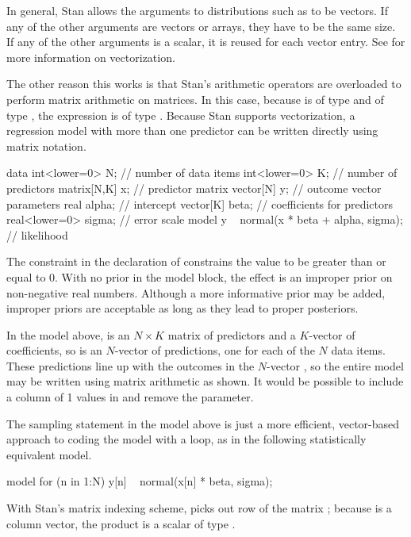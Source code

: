 In general, Stan allows the arguments to distributions such as
 to be vectors.  If any of the other arguments are
vectors or arrays, they have to be the same size.  If any of the other
arguments is a scalar, it is reused for each vector entry.  See
 for more information on vectorization.

The other reason this works is that Stan's arithmetic operators are
overloaded to perform matrix arithmetic on matrices.  In this case,
because  is of type  and  of type
, the expression  is of type .
Because Stan supports vectorization, a regression model with more than
one predictor can be written directly using matrix notation.
%
\begin{stancode}
data {
  int<lower=0> N;   // number of data items
  int<lower=0> K;   // number of predictors
  matrix[N,K] x;    // predictor matrix
  vector[N] y;      // outcome vector
}
parameters {
  real alpha;           // intercept
  vector[K] beta;       // coefficients for predictors
  real<lower=0> sigma;  // error scale
}
model {
  y ~ normal(x * beta + alpha, sigma);  // likelihood
}
\end{stancode}
%
The constraint  in the declaration of 
constrains the value to be greater than or equal to 0.  With no prior
in the model block, the effect is an improper prior on non-negative
real numbers.  Although a more informative prior may be added, improper
priors are acceptable as long as they lead to proper posteriors.

In the model above,  is an $N \times K$ matrix of predictors
and  a $K$-vector of coefficients, so  is an
$N$-vector of predictions, one for each of the $N$ data items.  These
predictions line up with the outcomes in the $N$-vector , so
the entire model may be written using matrix arithmetic as shown.  It
would be possible to include a column of 1 values in  and
remove the  parameter.  

The sampling statement in the model above is just a more efficient,
vector-based approach to coding the model with a loop, as in the
following statistically equivalent model.
%
\begin{stancode}
model {
  for (n in 1:N)
    y[n] ~ normal(x[n] * beta, sigma);
}
\end{stancode}
%
With Stan's matrix indexing scheme,  picks out row 
of the matrix ;  because  is a column vector, 
the product  is a scalar of type .

